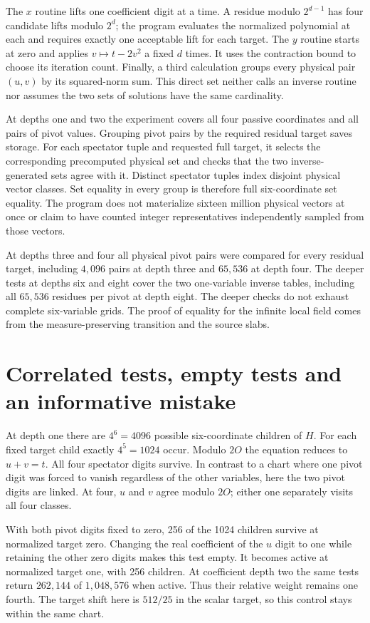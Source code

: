 \documentclass[12pt,letterpaper]{article}
\begin{document}
The $x$ routine lifts one coefficient digit at a time. A residue modulo $2^{d-1}$ has four candidate lifts modulo $2^d$; the program evaluates the normalized polynomial at each and requires exactly one acceptable lift for each target. The $y$ routine starts at zero and applies $v\mapsto t-2v^2$ a fixed $d$ times. It uses the contraction bound to choose its iteration count. Finally, a third calculation groups every physical pair $(u,v)$ by its squared-norm sum. This direct set neither calls an inverse routine nor assumes the two sets of solutions have the same cardinality.

At depths one and two the experiment covers all four passive coordinates and all pairs of pivot values. Grouping pivot pairs by the required residual target saves storage. For each spectator tuple and requested full target, it selects the corresponding precomputed physical set and checks that the two inverse-generated sets agree with it. Distinct spectator tuples index disjoint physical vector classes. Set equality in every group is therefore full six-coordinate set equality. The program does not materialize sixteen million physical vectors at once or claim to have counted integer representatives independently sampled from those vectors.

At depths three and four all physical pivot pairs were compared for every residual target, including $4,096$ pairs at depth three and $65,536$ at depth four. The deeper tests at depths six and eight cover the two one-variable inverse tables, including all $65,536$ residues per pivot at depth eight. The deeper checks do not exhaust complete six-variable grids. The proof of equality for the infinite local field comes from the measure-preserving transition and the source slabs.

\section{Correlated tests, empty tests and an informative mistake}
At depth one there are $4^6=4096$ possible six-coordinate children of $H$. For each fixed target child exactly $4^5=1024$ occur. Modulo $2O$ the equation reduces to $u+v=t$. All four spectator digits survive. In contrast to a chart where one pivot digit was forced to vanish regardless of the other variables, here the two pivot digits are linked. At four, $u$ and $v$ agree modulo $2O$; either one separately visits all four classes.

With both pivot digits fixed to zero, 256 of the 1024 children survive at normalized target zero. Changing the real coefficient of the $u$ digit to one while retaining the other zero digits makes this test empty. It becomes active at normalized target one, with 256 children. At coefficient depth two the same tests return $262,144$ of $1,048,576$ when active. Thus their relative weight remains one fourth. The target shift here is $512/25$ in the scalar target, so this control stays within the same chart.
\end{document}
